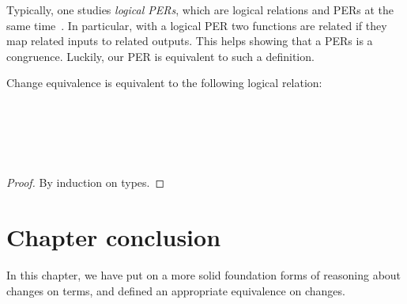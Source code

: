 Typically, one studies \emph{logical PERs}, which are logical
relations and PERs at the same time~\citep[Ch.~8]{Mitchell1996foundations}.
In particular, with a logical PER two functions are related if they map related
inputs to related outputs. This helps showing that a PERs is a congruence.
Luckily, our PER is equivalent to such a definition.

\begin{lemma}
Change equivalence is equivalent to the following logical relation:
\begin{hscode}\SaveRestoreHook
{}%
%
%
%
%
\>[3]{}\<[48]%
\>[48]{}\eqdef{}\<[E]%
\\
\>[3]{}\<[5]%
\>[5]{}\<[E]%
\\[\blanklineskip]%
\>[3]{}\<[48]%
\>[48]{}\eqdef{}\<[E]%
\\
\>[3]{}\<[5]%
\>[5]{}\forall {}\hsforall {}\<[E]%
\\
\>[3]{}\<[5]%
\>[5]{}\<[E]%
\ColumnHook
\end{hscode}\resethooks
\end{lemma}
\begin{proof}
  By induction on types.
\end{proof}


\section{Chapter conclusion}
\label{sec:term-reasoning-concl}
In this chapter, we have put on a more solid foundation
forms of reasoning about changes on terms, and defined an
appropriate equivalence on changes.
